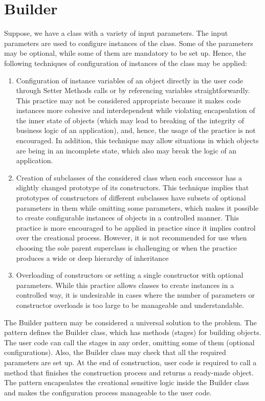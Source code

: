 \documentclass[12pt]{book}
\begin{document}
{{\section{Builder}
Suppose, we have a class with a variety of input parameters. The input parameters are used to configure instances of the class. Some of the parameters may be optional, while some of them are mandatory to be set up. Hence, the following techniques of configuration of instances of the class may be applied:
\begin{enumerate}
    \item Configuration of instance variables of an object directly in the user code through Setter Methods calls or by referencing variables straightforwardly. This practice may not be considered appropriate because it makes code instances more cohesive and interdependent while violating encapsulation of the inner state of objects (which may lead to breaking of the integrity of business logic of an application), and, hence, the usage of the practice is not encouraged. In addition, this technique may allow situations in which objects are being in an incomplete state, which also may break the logic of an application.
    \item Creation of subclasses of the considered class when each successor has a slightly changed prototype of its constructors. This technique implies that prototypes of constructors of different subclasses have subsets of optional parameters in them while omitting some parameters, which makes it possible to create configurable instances of objects in a controlled manner. This practice is more encouraged to be applied in practice since it implies control over the creational process. However, it is not recommended for use when choosing the sole parent superclass is challenging or when the practice produces a wide or deep hierarchy of inheritance
    \item Overloading of constructors or setting a single constructor with optional parameters. While this practice allows classes to create instances in a controlled way, it is undesirable in cases where the number of parameters or constructor overloads is too large to be manageable and understandable.
\end{enumerate}

The Builder pattern may be considered a universal solution to the problem. The pattern defines the Builder class, which has methods (stages) for building objects. The user code can call the stages in any order, omitting some of them (optional configurations). Also, the Builder class may check that all the required parameters are set up. At the end of construction, user code is required to call a method that finishes the construction process and returns a ready-made object. The pattern encapsulates the creational sensitive logic inside the Builder class and makes the configuration process manageable to the user code.

}}
\end{document}
